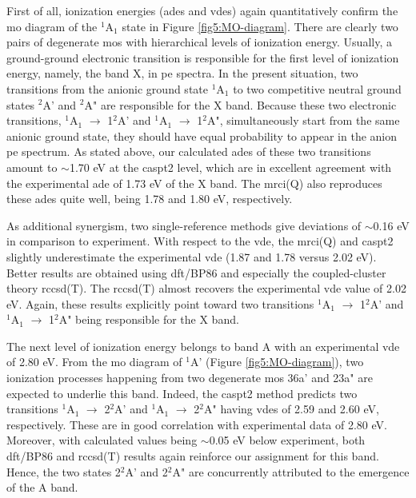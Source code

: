 \begin{refsection}
First of all, ionization energies (\acrshort{ade}s and \acrshort{vde}s) again quantitatively confirm the \acrshort{mo} diagram of the $^1$A$_1$ state in Figure \ref{fig5:MO-diagram}. There are clearly two pairs of degenerate \acrshort{mo}s with hierarchical levels of ionization energy. Usually, a ground-ground electronic transition is responsible for the first level of ionization energy, namely, the band X, in \acrshort{pe} spectra. In the present situation, two transitions from the anionic ground state $^1$A$_1$ to two competitive neutral ground states $^2$A' and $^2$A" are responsible for the X band. Because these two electronic transitions, $^1$A$_1$ $\longrightarrow$ 1$^2$A' and $^1$A$_1$ $\longrightarrow$ 1$^2$A", simultaneously start from the same anionic ground state, they should have equal probability to appear in the anion \acrshort{pe} spectrum. As stated above, our calculated \acrshort{ade}s of these two transitions amount to $\sim$1.70 eV at the \acrshort{caspt2} level, which are in excellent agreement with the experimental \acrshort{ade} of 1.73 eV of the X band. The \acrshort{mrci}(Q) also reproduces these \acrshort{ade}s quite well, being 1.78 and 1.80 eV, respectively.





As additional synergism, two single-reference methods give deviations of $\sim$0.16 eV in comparison to experiment. With respect to the \acrshort{vde}, the \acrshort{mrci}(Q) and \acrshort{caspt2} slightly underestimate the experimental \acrshort{vde} (1.87 and 1.78 versus 2.02 eV). Better results are obtained using \acrshort{dft}/BP86 and especially the coupled-cluster theory \acrshort{rccsd}(T). The \acrshort{rccsd}(T) almost recovers the experimental \acrshort{vde} value of 2.02 eV. Again, these results explicitly point toward two transitions $^1$A$_1$ $\longrightarrow$ 1$^2$A' and $^1$A$_1$ $\longrightarrow$ 1$^2$A" being responsible for the X band.





The next level of ionization energy belongs to band A with an experimental \acrshort{vde} of 2.80 eV. From the \acrshort{mo} diagram of $^1$A' (Figure \ref{fig5:MO-diagram}), two ionization processes happening from two degenerate \acrshort{mo}s 36a' and 23a" are expected to underlie this band. Indeed, the \acrshort{caspt2} method predicts two transitions $^1$A$_1$ $\longrightarrow$ 2$^2$A' and $^1$A$_1$ $\longrightarrow$ 2$^2$A" having \acrshort{vde}s of 2.59 and 2.60 eV, respectively. These are in good correlation with experimental data of 2.80 eV. Moreover, with calculated values being $\sim$0.05 eV below experiment, both \acrshort{dft}/BP86 and \acrshort{rccsd}(T) results again reinforce our assignment for this band. Hence, the two states 2$^2$A' and 2$^2$A" are concurrently attributed to the emergence of the A band.







\end{refsection}

